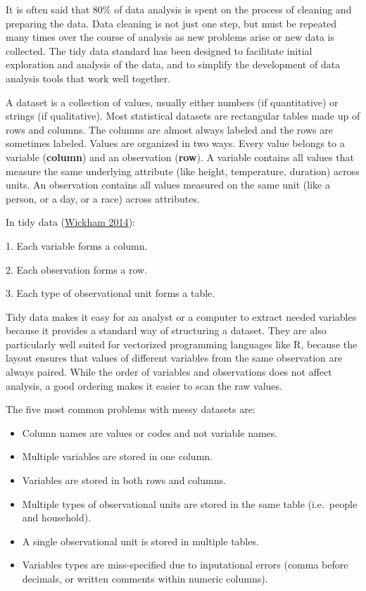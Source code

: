 \documentclass[
]{article}
\begin{document}
It is often said that 80\% of data analysis is spent on the process of
cleaning and preparing the data. Data cleaning is not just one step, but
must be repeated many times over the course of analysis as new problems
arise or new data is collected. The tidy data standard has been designed
to facilitate initial exploration and analysis of the data, and to
simplify the development of data analysis tools that work well together.

A dataset is a collection of values, usually either numbers (if
quantitative) or strings (if qualitative). Most statistical datasets are
rectangular tables made up of rows and columns. The columns are almost
always labeled and the rows are sometimes labeled. Values are organized
in two ways. Every value belongs to a variable (\textbf{column}) and an
observation (\textbf{row}). A variable contains all values that measure the
same underlying attribute (like height, temperature, duration) across
units. An observation contains all values measured on the same unit
(like a person, or a day, or a race) across attributes.

In tidy data (\protect\hyperlink{ref-wickham2014}{Wickham 2014}):

1. Each variable forms a column.

2. Each observation forms a row.

3. Each type of observational unit forms a table.

Tidy data makes it easy for an analyst or a computer to extract needed
variables because it provides a standard way of structuring a dataset.
They are also particularly well suited for vectorized programming
languages like R, because the layout ensures that values of different
variables from the same observation are always paired. While the order
of variables and observations does not affect analysis, a good ordering
makes it easier to scan the raw values.

The five most common problems with messy datasets are:

\begin{itemize}
\item
  Column names are values or codes and not variable names.
\item
  Multiple variables are stored in one column.
\item
  Variables are stored in both rows and columns.
\item
  Multiple types of observational units are stored in the same table
  (i.e.~people and household).
\item
  A single observational unit is stored in multiple tables.
\item
  Variables types are miss-specified due to inputational errors (comma
  before decimals, or written comments within numeric columns).
\end{itemize}
\end{document}
